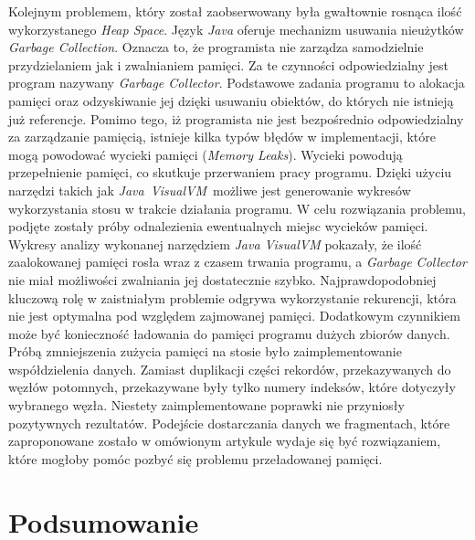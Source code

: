 \documentclass[12pt]{article}
\begin{document}
Kolejnym problemem, który został zaobserwowany była gwałtownie rosnąca ilość wykorzystanego \textit{Heap Space}.
Język \textit{Java} oferuje mechanizm usuwania nieużytków \textit{Garbage Collection}. Oznacza to, że programista nie zarządza
samodzielnie przydzielaniem jak i zwalnianiem pamięci. Za te czynności odpowiedzialny jest program nazywany \textit{Garbage Collector}.
Podstawowe zadania programu to alokacja pamięci oraz odzyskiwanie jej dzięki usuwaniu obiektów, do których nie istnieją już referencje.
Pomimo tego, iż programista nie jest bezpośrednio odpowiedzialny za zarządzanie pamięcią, istnieje kilka typów błędów w
implementacji, które mogą powodować wycieki pamięci (\textit{Memory Leaks}). Wycieki powodują przepełnienie pamięci,
co skutkuje przerwaniem pracy programu.
Dzięki użyciu narzędzi takich jak \textit{Java~VisualVM}~możliwe jest generowanie wykresów wykorzystania stosu
w trakcie działania programu.
W celu rozwiązania problemu, podjęte zostały próby odnalezienia ewentualnych miejsc wycieków pamięci.
Wykresy analizy wykonanej narzędziem \textit{Java VisualVM} pokazały, że ilość zaalokowanej pamięci rosła wraz
z czasem trwania programu, a \textit{Garbage Collector} nie miał możliwości zwalniania jej dostatecznie szybko. 
Najprawdopodobniej kluczową rolę w zaistniałym problemie odgrywa wykorzystanie rekurencji, która nie jest optymalna pod względem
zajmowanej pamięci. Dodatkowym czynnikiem może być konieczność ładowania do pamięci programu dużych zbiorów danych.
Próbą zmniejszenia zużycia pamięci na stosie było zaimplementowanie współdzielenia danych. Zamiast duplikacji części rekordów,
przekazywanych do węzłów potomnych, przekazywane były tylko numery indeksów, które dotyczyły wybranego węzła.
Niestety zaimplementowane poprawki nie przyniosły pozytywnych rezultatów.
Podejście dostarczania danych we fragmentach, które zaproponowane zostało w omówionym artykule \cite{parallel-algorithm-to-induce-decision-trees}
wydaje się być rozwiązaniem, które mogłoby pomóc pozbyć się problemu przeładowanej pamięci.

\newpage

\cleardoublepage
{}
{}
\section*{Podsumowanie}
\newpage

\cleardoublepage
{}
{}
\listoftables

\listoffigures
\end{document}
